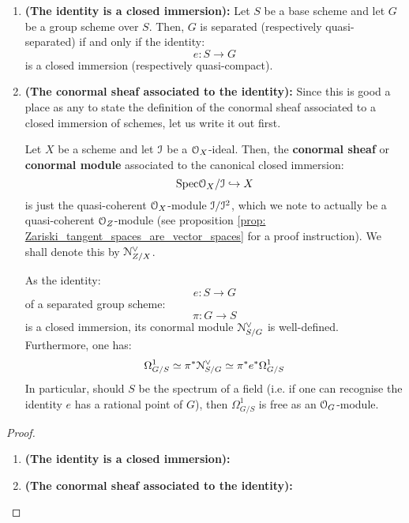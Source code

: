                 \begin{proposition} \label{prop: conormal_sheaf_of_the_identity}
                    \noindent
                    \begin{enumerate}
                        \item \textbf{(The identity is a closed immersion):} Let $S$ be a base scheme and let $G$ be a group scheme over $S$. Then, $G$ is separated (respectively quasi-separated) if and only if the identity:
                            $$e: S \to G$$
                        is a closed immersion (respectively quasi-compact). 
                        \item \textbf{(The conormal sheaf associated to the identity):} Since this is good a place as any to state the definition of the conormal sheaf associated to a closed immersion of schemes, let us write it out first.
                        
                        Let $X$ be a scheme and let $\mathcal{I}$ be a $\mathcal{O}_X$-ideal. Then, the \textbf{conormal sheaf} or \textbf{conormal module} associated to the canonical closed immersion:
                            $$\mathrm{Spec} \mathcal{O}_X/\mathcal{I} \hookrightarrow X$$
                        is just the quasi-coherent $\mathcal{O}_X$-module $\mathcal{I}/\mathcal{I}^2$, which we note to actually be a quasi-coherent $\mathcal{O}_Z$-module (see proposition \ref{prop: Zariski_tangent_spaces_are_vector_spaces} for a proof instruction). We shall denote this by $\mathcal{N}^{\vee}_{Z/X}$.
                        
                        As the identity:
                            $$e: S \to G$$
                        of a separated group scheme:
                            $$\pi: G \to S$$
                        is a closed immersion, its conormal module $\mathcal{N}^{\vee}_{S/G}$ is well-defined. Furthermore, one has:
                            $$\Omega^1_{G/S} \simeq \pi^* \mathcal{N}^{\vee}_{S/G} \simeq \pi^* e^* \Omega^1_{G/S}$$
                        In particular, should $S$ be the spectrum of a field (i.e. if one can recognise the identity $e$ has a rational point of $G$), then $\Omega^1_{G/S}$ is free as an $\mathcal{O}_G$-module.   
                    \end{enumerate}
                \end{proposition}
                    \begin{proof}
                        \noindent
                        \begin{enumerate}
                            \item \textbf{(The identity is a closed immersion):}
                            \item \textbf{(The conormal sheaf associated to the identity):}
                        \end{enumerate}
                    \end{proof}
                    
